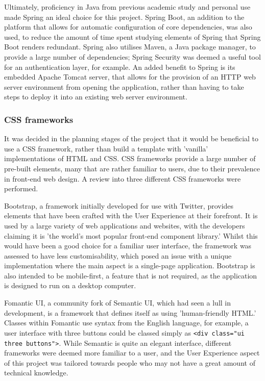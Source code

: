 Ultimately, proficiency in Java from previous academic study and personal use made Spring an ideal choice for this project. Spring Boot, an addition to the platform that allows for automatic configuration of core dependencies, was also used, to reduce the amount of time spent studying elements of Spring that Spring Boot renders redundant. Spring also utilises Maven, a Java package manager, to provide a large number of dependencies; Spring Security was deemed a useful tool for an authentication layer, for example. An added benefit to Spring is its embedded Apache Tomcat server, that allows for the provision of an HTTP web server environment from opening the application, rather than having to take steps to deploy it into an existing web server environment.

\subsubsection{CSS frameworks}

It was decided in the planning stages of the project that it would be beneficial to use a CSS framework, rather than build a template with 'vanilla' implementations of HTML and CSS. CSS frameworks provide a large number of pre-built elements, many that are rather familiar to users, due to their prevalence in front-end web design. A review into three different CSS frameworks were performed.

Bootstrap, a framework initially developed for use with Twitter, provides elements that have been crafted with the User Experience at their forefront. It is used by a large variety of web applications and websites, with the developers claiming it is 'the world's most popular front-end component library.' Whilst this would have been a good choice for a familiar user interface, the framework was assessed to have less customisability, which posed an issue with a unique implementation where the main aspect is a single-page application. Bootstrap is also intended to be mobile-first, a feature that is not required, as the application is designed to run on a desktop computer\cite{CochranDavid2012TBwd}.

Fomantic UI, a community fork of Semantic UI, which had seen a lull in development, is a framework that defines itself as using 'human-friendly HTML.' Classes within Fomantic use syntax from the English language, for example, a user interface with three buttons could be classed simply as \texttt{<div class="ui three buttons">}. While Semantic is quite an elegant interface, different frameworks were deemed more familiar to a user, and the User Experience aspect of this project was tailored towards people who may not have a great amount of technical knowledge\cite{Fomantic}.

